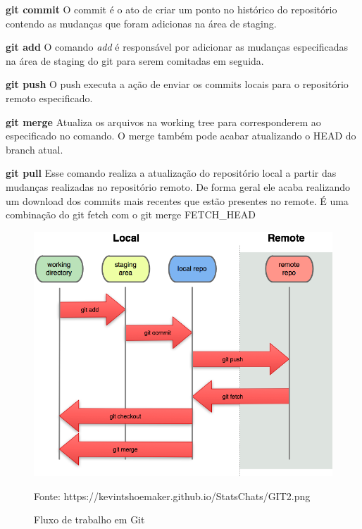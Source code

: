 \documentclass[]{politex}
\newcommand{\legend}[1]{\begin{center}\def\caption{}\caption{#1}\end{center}}
\begin{document}
	\textbf{git commit}
	\newline
	O commit é o ato de criar um ponto no histórico do repositório contendo as mudanças que foram adicionas na área de staging.
	
	\textbf{git add}
	\newline
	O comando \textit{add} é responsável por adicionar as mudanças especificadas na área de staging do git para serem comitadas em seguida.
	
	\textbf{git push}
	\newline
	O push executa a ação de enviar os commits locais para o repositório remoto especificado.
	
	\textbf{git merge}
	\newline
	Atualiza os arquivos na working tree para corresponderem ao especificado no comando. O merge também pode acabar atualizando o HEAD do branch atual.
	
	\textbf{git pull}
	\newline
	Esse comando realiza a atualização do repositório local a partir das mudanças realizadas no repositório remoto. De forma geral ele acaba realizando um download dos commits mais recentes que estão presentes no remote. É uma combinação do git fetch com o git merge FETCH\_HEAD
	
	\begin{figure}[htb]
		\caption{\label{fig_git2}Fluxo de trabalho em Git}
		\begin{center}
		\includegraphics[scale=1]{GIT2.png}
		\end{center}
		\legend{Fonte: https://kevintshoemaker.github.io/StatsChats/GIT2.png}
	\end{figure}
\end{document}
